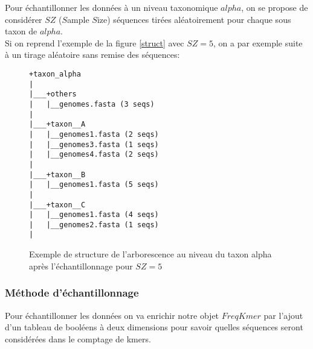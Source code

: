 Pour échantillonner les données à un niveau taxonomique $alpha$, on se propose de considérer $SZ$ ($S$ample $S$ize) séquences tirées aléatoirement pour chaque sous taxon
de $alpha$.
\\

Si on reprend l'exemple de la figure \ref{struct} avec $SZ=5$, on a par exemple suite à un tirage aléatoire sans remise des séquences:

\begin{figure}[H]
\centering
\begin{varwidth}{\linewidth}
\begin{verbatim}
+taxon_alpha
|
|___+others
|   |__genomes.fasta (3 seqs)
|   
|___+taxon__A
|   |__genomes1.fasta (2 seqs)
|   |__genomes3.fasta (1 seqs) 
|   |__genomes4.fasta (2 seqs)
|   
|___+taxon__B
|   |__genomes1.fasta (5 seqs)
|   
|___+taxon__C 
|   |__genomes1.fasta (4 seqs)
|   |__genomes2.fasta (1 seqs)
|

\end{verbatim}
\end{varwidth}
\caption[Structure au niveau du taxon alpha après échantillonnage]{\label{struct_sample}Exemple de structure de l'arborescence au niveau du taxon alpha après l'échantillonnage pour $SZ=5$}
\end{figure}

\subsubsection{Méthode d'échantillonnage}

Pour échantillonner les données on va enrichir notre objet $FreqKmer$ par l'ajout d'un tableau de booléens à deux dimensions  pour savoir quelles séquences seront considérées dans le comptage de kmers.

